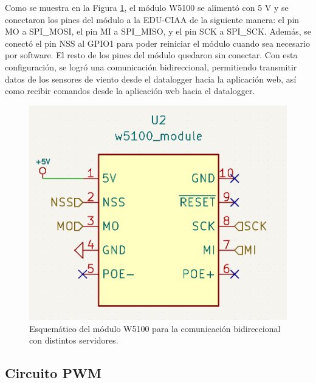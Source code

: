 Como se muestra en la Figura \ref{fig:esquemEthernet}, el módulo W5100 se alimentó con 5 \unit{\volt} y se conectaron los pines del módulo a la EDU-CIAA de la siguiente manera: el pin MO a SPI\_MOSI, el pin MI a SPI\_MISO, y el pin SCK a SPI\_SCK. Además, se conectó el pin NSS al GPIO1 para poder reiniciar el módulo cuando sea necesario por software. El resto de los pines del módulo quedaron sin conectar. Con esta configuración, se logró una comunicación bidireccional, permitiendo transmitir datos de los sensores de viento desde el datalogger hacia la aplicación web, así como recibir comandos desde la aplicación web hacia el datalogger.
\begin{figure}[H]
    \centering
    \includegraphics[width=0.5\linewidth]{Figuras/datalogger/Hardware/esquemEthernet.png}
    \caption{Esquemático del módulo W5100 para la comunicación bidireccional con distintos servidores.}
    \label{fig:esquemEthernet}
\end{figure}


\subsection{Circuito PWM}\label{sec:circuitoPWM}


